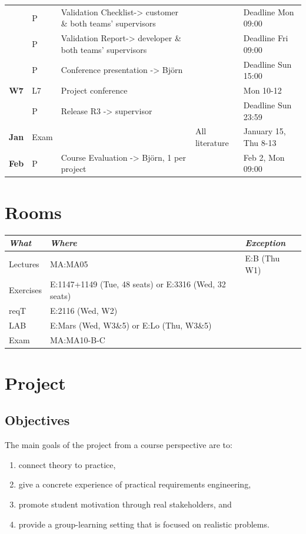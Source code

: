 \documentclass[10pt,a4paper]{article}
\begin{document}
\begin{flushleft}
\begin{tabular}{c | p{0.5cm} p{4.4cm} p{2.2cm}  p{3.2cm}}
 & P &  \multirow{1}{*}{\footnotesize Validation Checklist-> customer \& both teams' supervisors} & & Deadline Mon  09:00  \\ & P &  \multirow{1}{*}{\footnotesize Validation Report-> developer \& both teams' supervisors} & & Deadline Fri  09:00  \\
 & P & Conference presentation -> Björn& & Deadline Sun  15:00  \\
\hline
\multirow{1}{*}{{\bfseries\sffamily W7}} 
 & L7 & Project conference &  & Mon 10-12\\
 & P & Release R3 -> supervisor & & Deadline Sun 23:59\\
  \hline
\multirow{1}{*}{{\bfseries\sffamily Jan }} 
  & Exam & &All literature  & January 15, Thu 8-13 \\
\multirow{1}{*}{{\bfseries\sffamily Feb }}   
  &  P & \multirow{1}{*}{Course Evaluation -> Björn, 1 per project} & & Feb 2, Mon 09:00\\

\hline
\end{tabular} 
\end{flushleft}

\section{Rooms}
\begin{flushleft}
\small
\begin{tabular}{l | l | l} 
{\it What} & {\it Where} & {\it Exception} \\
\hline
Lectures & MA:MA05 & E:B (Thu W1)  \\
Exercises & E:1147+1149 (Tue, 48 seats) or E:3316 (Wed, 32 seats)   \\
reqT & E:2116 (Wed, W2)   \\
LAB & E:Mars (Wed, W3\&5) or E:Lo (Thu, W3\&5)\\
Exam & MA:MA10-B-C \\
\end{tabular}
\end{flushleft}
\newpage
\section{Project}
\subsection{Objectives}
The main goals of the project from a course perspective are to:
\begin{enumerate}[noitemsep]
\item connect theory to practice,
\item give a concrete experience of practical requirements engineering,
\item promote student motivation through real stakeholders, and
\item provide a group-learning setting that is focused on realistic problems.
\end{enumerate}
\end{document}
